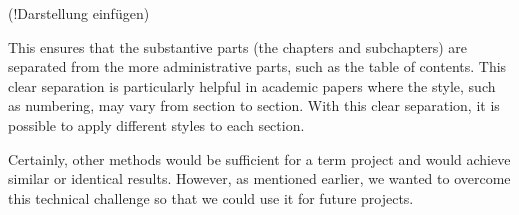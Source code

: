 (!Darstellung einfügen)

This ensures that the substantive parts (the chapters and subchapters) are separated from the more administrative parts, such as the table of contents. This clear separation is particularly helpful in academic papers where the style, such as numbering, may vary from section to section. With this clear separation, it is possible to apply different styles to each section.

Certainly, other methods would be sufficient for a term project and would achieve similar or identical results. However, as mentioned earlier, we wanted to overcome this technical challenge so that we could use it for future projects.